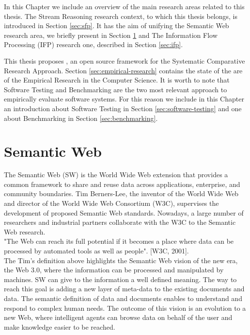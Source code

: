 In this Chapter we include an overview of the main research areas related to this thesis. The Stream Reasoning research context, to which this thesis belongs, is introduced in Section \ref{sec:sfp}. It has the aim of unifying the Semantic Web research area, we briefly present in Section \ref{sec:sw} and The Information Flow Processing (IFP) research one, described in Section \ref{sec:ifp}. 

This thesis proposes \namens, an open source framework for the Systematic Comparative Research Approach. Section \ref{sec:empirical-research} contains the state of the are of the Empirical Research in the Computer Science. It is worth to note that Software Testing and Benchmarking are the two most relevant approach to empirically evaluate software systems. For this reason we include in this Chapter an introduction about Software Testing in Section \ref{sec:software-testing} and one about Benchmarking in Section \ref{sec:benchmarking}.

\section{Semantic Web}\label{sec:sw}

The Semantic Web (SW) is the World Wide Web extension  that  provides a common framework to share and reuse data across applications, enterprise, and community boundaries. Tim Berners-Lee, the inventor of the World Wide Web and director of the World Wide Web Consortium (W3C), supervises the development of proposed Semantic Web standards. Nowadays, a large number of researchers and industrial partners collaborate with the W3C to the Semantic Web research.\\

"The Web can reach its full potential if it becomes a place where data can be processed by automated tools as well as people". [W3C, 2001]. \\ The Tim's definition above highlights the Semantic Web vision of the new era, the Web 3.0,  where the information can be processed and manipulated by machines. SW can give to the information a well defined meaning. The way to reach this goal is adding a new layer of meta-data to the existing documents and data. The semantic definition of data and documents enables to understand and respond to complex human needs. The outcome of this vision is an evolution to a new Web, where intelligent agents can browse data on behalf of the user and make knowledge easier to be reached.


